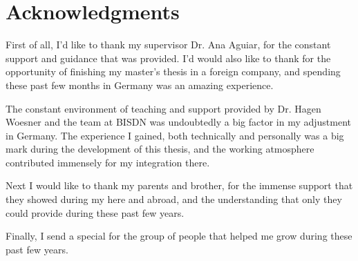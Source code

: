\chapter*{Acknowledgments}

First of all, I'd like to thank my supervisor Dr. Ana Aguiar, for the constant support and guidance that was provided. I'd would also like to thank for the 
opportunity of finishing my master's thesis in a foreign company, and spending these past few months in Germany was an amazing experience.

\par The constant environment of teaching and support provided by Dr. Hagen Woesner and the team at BISDN was undoubtedly a big factor in my adjustment in Germany.
The experience I gained, both technically and personally was a big mark during the development of this thesis, and the working atmosphere contributed immensely
for my integration there.

\par Next I would like to thank my parents and brother, for the immense support that they showed during my here and abroad, and the understanding that only they 
could provide during these past few years. 

\par Finally, I send a special for the group of people that helped me grow during these past few years.

